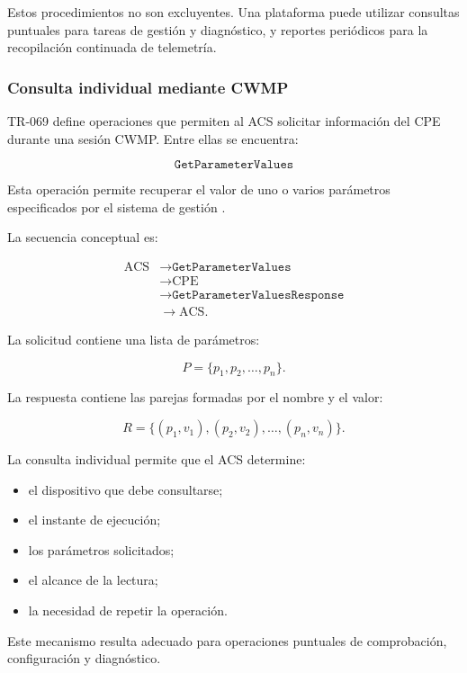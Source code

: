 Estos procedimientos no son excluyentes. Una plataforma puede utilizar
consultas puntuales para tareas de gestión y diagnóstico, y reportes
periódicos para la recopilación continuada de telemetría.


\subsubsection*{Consulta individual mediante CWMP}

TR-069 define operaciones que permiten al ACS solicitar información del
CPE durante una sesión CWMP. Entre ellas se encuentra:

\[
    \texttt{GetParameterValues}
\]

Esta operación permite recuperar el valor de uno o varios parámetros
especificados por el sistema de gestión \cite{bbf_tr069}.

La secuencia conceptual es:

\[
\begin{aligned}
    \text{ACS}
    &\longrightarrow
    \texttt{GetParameterValues}\\
    &\longrightarrow
    \text{CPE}\\
    &\longrightarrow
    \texttt{GetParameterValuesResponse}\\
    &\longrightarrow
    \text{ACS}.
\end{aligned}
\]

La solicitud contiene una lista de parámetros:

\[
    P
    =
    \{
        p_1,
        p_2,
        \ldots,
        p_n
    \}.
\]

La respuesta contiene las parejas formadas por el nombre y el valor:

\[
    R
    =
    \{
        (p_1,v_1),
        (p_2,v_2),
        \ldots,
        (p_n,v_n)
    \}.
\]

La consulta individual permite que el ACS determine:

\begin{itemize}
    \item el dispositivo que debe consultarse;
    \item el instante de ejecución;
    \item los parámetros solicitados;
    \item el alcance de la lectura;
    \item la necesidad de repetir la operación.
\end{itemize}

Este mecanismo resulta adecuado para operaciones puntuales de
comprobación, configuración y diagnóstico.


